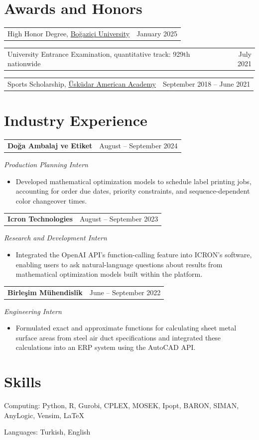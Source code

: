 \documentclass[a4paper,11pt]{article}
\makeatletter
\newcommand{\cvsection}[1]{\Needspace{4\baselineskip}\section*{#1}}
\newcommand{\cvline}[2]{%
  \begin{tabularx}{\linewidth}[t]{@{}>{\raggedright\arraybackslash}X r@{}}%
    #1 & #2 \\
  \end{tabularx}\par
}
\newcommand{\cvheading}[2]{\Needspace{3\baselineskip}\cvline{#1}{#2}}
\newcommand{\entrygap}{\par\vspace{6pt}}
\makeatother
\begin{document}
\cvsection{Awards and Honors}

\cvheading{High Honor Degree, \href{https://bogazici.edu.tr/}{Boğaziçi University}}{January 2025}

\par\vspace{1pt}
\cvheading{University Entrance Examination, quantitative track: 929th nationwide}{July 2021}

\par\vspace{1pt}
\cvheading{Sports Scholarship, \href{https://www.uaa.k12.tr/}{Üsküdar American Academy}}{September 2018 -- June 2021}




\cvsection{Industry Experience}

\cvheading{\textbf{Doğa Ambalaj ve Etiket}}{August -- September 2024}
\textit{Production Planning Intern}\par
\begin{itemize}
  \item Developed mathematical optimization models to schedule label printing jobs, accounting for order due dates, priority constraints, and sequence-dependent color changeover times.
\end{itemize}

\entrygap
\cvheading{\textbf{Icron Technologies}}{August -- September 2023}
\textit{Research and Development Intern}\par
\begin{itemize}
  \item Integrated the OpenAI API's function-calling feature into ICRON's software, enabling users to ask natural-language questions about results from mathematical optimization models built within the platform.
\end{itemize}

\entrygap
\cvheading{\textbf{Birleşim Mühendislik}}{June -- September 2022}
\textit{Engineering Intern}\par
\begin{itemize}
  \item Formulated exact and approximate functions for calculating sheet metal surface areas from steel air duct specifications and integrated these calculations into an ERP system using the AutoCAD API.
\end{itemize}

\cvsection{Skills}
Computing: Python, R, Gurobi, CPLEX, MOSEK, Ipopt, BARON, SIMAN, AnyLogic, Vensim, \LaTeX \par
Languages: Turkish, English
\end{document}

